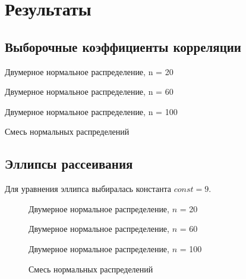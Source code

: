 \section{Результаты}
\subsection{Выборочные коэффициенты корреляции}
\begin{table}[H]
	\centering
	
	\caption{Двумерное нормальное распределение, n = 20}
	\label{tab:n20}
\end{table}
\begin{table}[H]
	\centering
	
	\caption{Двумерное нормальное распределение, n = 60}
	\label{tab:n60}
\end{table}
\begin{table}[H]
	\centering
	
	\caption{Двумерное нормальное распределение, n = 100}
	\label{tab:n100}
\end{table}
\begin{table}[H]
	\centering
	
	\caption{Смесь нормальных распределений}
	\label{tab:mix}
\end{table}

\subsection{Эллипсы рассеивания}
\begin{flushleft}
	Для уравнения эллипса выбиралась константа $const = 9$.
\end{flushleft}
\begin{figure}[H]
	\caption{Двумерное нормальное распределение, $n$ = 20}
	\label{fig:n20}
\end{figure}
\begin{figure}[H]
	\caption{Двумерное нормальное распределение, $n$ = 60}
	\label{fig:n60}
\end{figure}
\begin{figure}[H]
	\caption{Двумерное нормальное распределение, $n$ = 100}
	\label{fig:n100}
\end{figure}
\begin{figure}[H]
	\caption{Смесь нормальных распределений}
	\label{fig:mix}
\end{figure}

